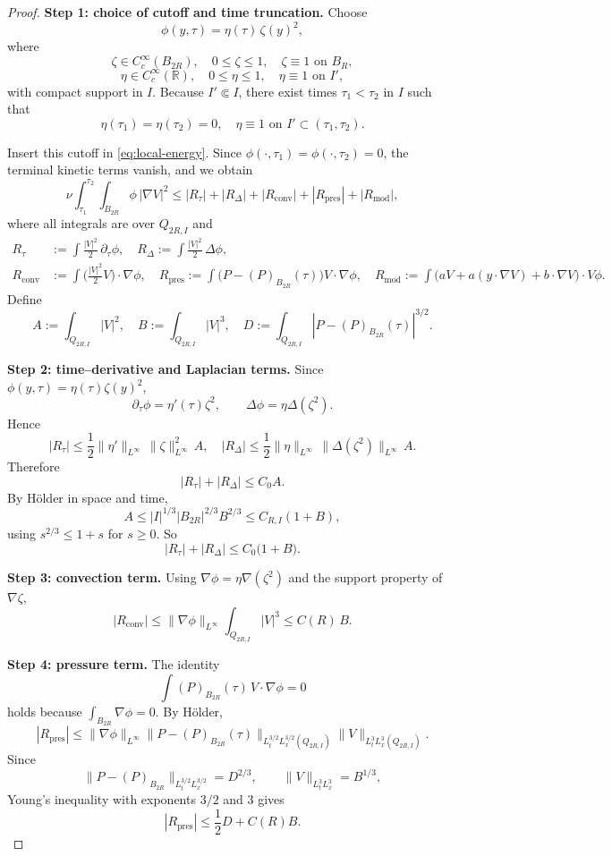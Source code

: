 \documentclass[11pt]{amsart}
\theoremstyle{plain}
\theoremstyle{definition}
\begin{document}
\begin{proof}
\textbf{Step 1: choice of cutoff and time truncation.}
Choose
\[
\phi(y,\tau)=\eta(\tau)\,\zeta(y)^2,
\]
where
\[
\zeta\in C_c^\infty(B_{2R}),\quad 0\le\zeta\le1,\quad
\zeta\equiv1 \text{ on }B_R,
\]
\[
\eta\in C_c^\infty(\mathbb R),\quad 0\le\eta\le1,
\quad \eta\equiv1\text{ on }I',
\]
with compact support in $I$. Because $I'\Subset I$, there exist times $\tau_1<\tau_2$ in $I$ such that
\[
\eta(\tau_1)=\eta(\tau_2)=0,
\quad
\eta\equiv1\text{ on }I'\subset(\tau_1,\tau_2).
\]

Insert this cutoff in \eqref{eq:local-energy}. Since $\phi(\cdot,\tau_1)=\phi(\cdot,\tau_2)=0$, the terminal kinetic terms vanish, and we obtain
\[
\nu\int_{\tau_1}^{\tau_2}\!\int_{B_{2R}}\phi\,|\nabla V|^2
\le |R_\tau|+|R_\Delta|+|R_{\mathrm{conv}}|+|R_{\mathrm{pres}}|+|R_{\mathrm{mod}}|,
\]
where all integrals are over $Q_{2R,I}$ and
\[
\begin{aligned}
R_\tau&:=\int \frac{|V|^2}{2}\,\partial_\tau\phi,
\quad R_\Delta:=\int \frac{|V|^2}{2}\,\Delta\phi,\\
R_{\mathrm{conv}}&:=\int \bigl(\tfrac{|V|^2}{2}V\bigr)\cdot\nabla\phi,
\quad
R_{\mathrm{pres}}:=\int \bigl(P-(P)_{B_{2R}}(\tau)\bigr)V\cdot\nabla\phi,
\quad
R_{\mathrm{mod}}:=\int \bigl(aV+a(y\cdot\nabla V)+b\cdot\nabla V\bigr)\cdot V\phi.
\end{aligned}
\]
Define
\[
A:=\int_{Q_{2R,I}}|V|^2,
\quad
B:=\int_{Q_{2R,I}}|V|^3,
\quad
D:=\int_{Q_{2R,I}}|P-(P)_{B_{2R}}(\tau)|^{3/2}.
\]

\textbf{Step 2: time--derivative and Laplacian terms.}
Since $\phi(y,\tau)=\eta(\tau)\zeta(y)^2$,
\[
\partial_\tau\phi=\eta'(\tau)\zeta^2,
\qquad
\Delta\phi=\eta\Delta(\zeta^2).
\]
Hence
\[
|R_\tau|
\le\frac12\|\eta'\|_{L^\infty}\,\|\zeta\|_{L^\infty}^2\,A,
\quad
|R_\Delta|
\le\frac12\|\eta\|_{L^\infty}\,\|\Delta(\zeta^2)\|_{L^\infty}\,A.
\]
Therefore
\[
|R_\tau|+|R_\Delta|\le C_0A.
\]
By Hölder in space and time,
\[
A\le|I|^{1/3}|B_{2R}|^{2/3}B^{2/3}\le C_{R,I}(1+B),
\]
using $s^{2/3}\le1+s$ for $s\ge0$. So
\[
|R_\tau|+|R_\Delta|\le C_0\bigl(1+B\bigr).
\]

\textbf{Step 3: convection term.}
Using $\nabla\phi=\eta\nabla(\zeta^2)$ and the support property of $\nabla\zeta$,
\[
|R_{\mathrm{conv}}|
\le \|\nabla\phi\|_{L^\infty}\int_{Q_{2R,I}}|V|^3
\le C(R)\,B.
\]

\textbf{Step 4: pressure term.}
The identity
\[
\int (P)_{B_{2R}}(\tau)\,V\cdot\nabla\phi=0
\]
holds because $\int_{B_{2R}}\nabla\phi=0$. By Hölder,
\[
|R_{\mathrm{pres}}|
\le \|\nabla\phi\|_{L^\infty}\|P-(P)_{B_{2R}}(\tau)
\|_{L_t^{3/2}L_x^{3/2}(Q_{2R,I})}\|V\|_{L_t^3L_x^3(Q_{2R,I})}.
\]
Since
\[
\|P-(P)_{B_{2R}}\|_{L_t^{3/2}L_x^{3/2}}=D^{2/3},
\qquad
\|V\|_{L_t^3L_x^3}=B^{1/3},
\]
Young's inequality with exponents $3/2$ and $3$ gives
\[
|R_{\mathrm{pres}}|\le \frac12 D + C(R) B.
\]


\end{proof}
\end{document}
